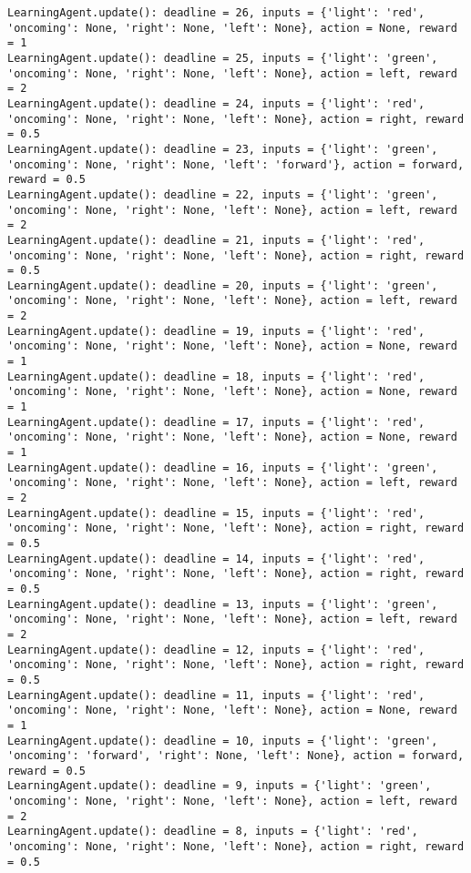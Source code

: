 \documentclass{article}
\begin{document}
\begin{verbatim}
LearningAgent.update(): deadline = 26, inputs = {'light': 'red', 'oncoming': None, 'right': None, 'left': None}, action = None, reward = 1
LearningAgent.update(): deadline = 25, inputs = {'light': 'green', 'oncoming': None, 'right': None, 'left': None}, action = left, reward = 2
LearningAgent.update(): deadline = 24, inputs = {'light': 'red', 'oncoming': None, 'right': None, 'left': None}, action = right, reward = 0.5
LearningAgent.update(): deadline = 23, inputs = {'light': 'green', 'oncoming': None, 'right': None, 'left': 'forward'}, action = forward, reward = 0.5
LearningAgent.update(): deadline = 22, inputs = {'light': 'green', 'oncoming': None, 'right': None, 'left': None}, action = left, reward = 2
LearningAgent.update(): deadline = 21, inputs = {'light': 'red', 'oncoming': None, 'right': None, 'left': None}, action = right, reward = 0.5
LearningAgent.update(): deadline = 20, inputs = {'light': 'green', 'oncoming': None, 'right': None, 'left': None}, action = left, reward = 2
LearningAgent.update(): deadline = 19, inputs = {'light': 'red', 'oncoming': None, 'right': None, 'left': None}, action = None, reward = 1
LearningAgent.update(): deadline = 18, inputs = {'light': 'red', 'oncoming': None, 'right': None, 'left': None}, action = None, reward = 1
LearningAgent.update(): deadline = 17, inputs = {'light': 'red', 'oncoming': None, 'right': None, 'left': None}, action = None, reward = 1
LearningAgent.update(): deadline = 16, inputs = {'light': 'green', 'oncoming': None, 'right': None, 'left': None}, action = left, reward = 2
LearningAgent.update(): deadline = 15, inputs = {'light': 'red', 'oncoming': None, 'right': None, 'left': None}, action = right, reward = 0.5
LearningAgent.update(): deadline = 14, inputs = {'light': 'red', 'oncoming': None, 'right': None, 'left': None}, action = right, reward = 0.5
LearningAgent.update(): deadline = 13, inputs = {'light': 'green', 'oncoming': None, 'right': None, 'left': None}, action = left, reward = 2
LearningAgent.update(): deadline = 12, inputs = {'light': 'red', 'oncoming': None, 'right': None, 'left': None}, action = right, reward = 0.5
LearningAgent.update(): deadline = 11, inputs = {'light': 'red', 'oncoming': None, 'right': None, 'left': None}, action = None, reward = 1
LearningAgent.update(): deadline = 10, inputs = {'light': 'green', 'oncoming': 'forward', 'right': None, 'left': None}, action = forward, reward = 0.5
LearningAgent.update(): deadline = 9, inputs = {'light': 'green', 'oncoming': None, 'right': None, 'left': None}, action = left, reward = 2
LearningAgent.update(): deadline = 8, inputs = {'light': 'red', 'oncoming': None, 'right': None, 'left': None}, action = right, reward = 0.5

\end{verbatim}
\end{document}
